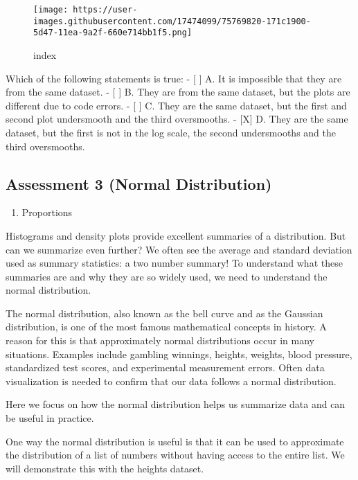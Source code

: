 \documentclass[]{article}
\providecommand{\tightlist}{%
  \setlength{\itemsep}{0pt}\setlength{\parskip}{0pt}}
\begin{document}
\begin{figure}
\centering
\texttt{[image: https://user-images.githubusercontent.com/17474099/75769820-171c1900-5d47-11ea-9a2f-660e714bb1f5.png]}
\caption{index}
\end{figure}

Which of the following statements is true: - {[} {]} A. It is impossible
that they are from the same dataset. - {[} {]} B. They are from the same
dataset, but the plots are different due to code errors. - {[} {]} C.
They are the same dataset, but the first and second plot undersmooth and
the third oversmooths. - {[}X{]} D. They are the same dataset, but the
first is not in the log scale, the second undersmooths and the third
oversmooths.

\hypertarget{assessment-3-normal-distribution}{%
\subsection{Assessment 3 (Normal
Distribution)}\label{assessment-3-normal-distribution}}

\begin{enumerate}
\def\labelenumi{\arabic{enumi}.}
\tightlist
\item
  Proportions
\end{enumerate}

Histograms and density plots provide excellent summaries of a
distribution. But can we summarize even further? We often see the
average and standard deviation used as summary statistics: a two number
summary! To understand what these summaries are and why they are so
widely used, we need to understand the normal distribution.

The normal distribution, also known as the bell curve and as the
Gaussian distribution, is one of the most famous mathematical concepts
in history. A reason for this is that approximately normal distributions
occur in many situations. Examples include gambling winnings, heights,
weights, blood pressure, standardized test scores, and experimental
measurement errors. Often data visualization is needed to confirm that
our data follows a normal distribution.

Here we focus on how the normal distribution helps us summarize data and
can be useful in practice.

One way the normal distribution is useful is that it can be used to
approximate the distribution of a list of numbers without having access
to the entire list. We will demonstrate this with the heights dataset.
\end{document}
